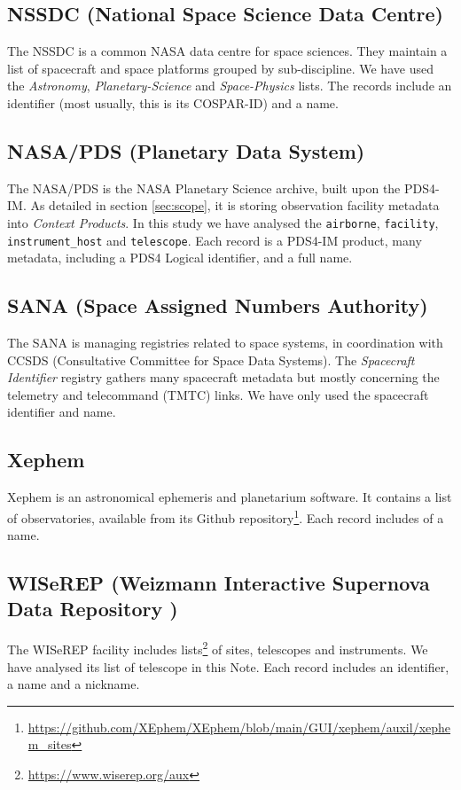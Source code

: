 \documentclass[11pt,a4paper]{ivoa}
\begin{document}
\subsection{NSSDC (National Space Science Data Centre)}
The NSSDC is a common NASA data centre for space sciences. They maintain a
list of spacecraft and space platforms grouped by sub-discipline. We have
used the \emph{Astronomy}, \emph{Planetary-Science} and \emph{Space-Physics}
lists. The records include an identifier (most usually, this is its
COSPAR-ID) and a name.

\subsection{NASA/PDS (Planetary Data System)}
The NASA/PDS is the NASA Planetary Science archive, built upon the
PDS4-IM. As detailed in section \ref{sec:scope}, it is storing
observation facility metadata into \emph{Context Products}. In this
study we have analysed the \texttt{airborne}, \texttt{facility},
\texttt{instrument\_host} and \texttt{telescope}. Each record is
a PDS4-IM product, many metadata, including a PDS4 Logical
identifier, and a full name.

\subsection{SANA (Space Assigned Numbers Authority)}
The SANA is managing registries related to space systems, in
coordination with CCSDS (Consultative Committee for Space Data
Systems). The \emph{Spacecraft Identifier} registry gathers many
spacecraft metadata but mostly concerning the telemetry and
telecommand (TMTC) links. We have only used the
spacecraft identifier and name.

\subsection{Xephem}
Xephem is an astronomical ephemeris and planetarium software. It
contains a list of observatories, available from its Github
repository\footnote{\url{https://github.com/XEphem/XEphem/blob/main/GUI/xephem/auxil/xephem_sites}}.
Each record includes of a name.

\subsection{WISeREP (Weizmann Interactive Supernova Data Repository )}
The WISeREP facility includes lists\footnote{\url{https://www.wiserep.org/aux}}
of sites, telescopes and instruments. We have analysed its list of telescope
in this Note. Each record includes an identifier, a name and a
nickname.
\end{document}

